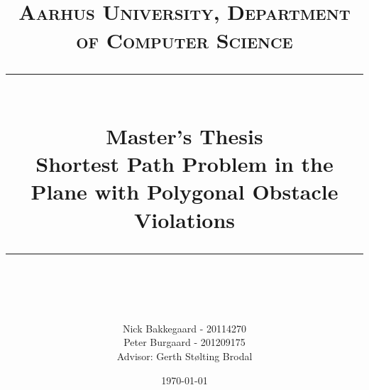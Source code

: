


\newcommand{\gerth}[1]{\todo[color=black!40]{#1}}
\newcommand{\nick}[1]{\todo[color=green!40]{#1}}
\newcommand{\peter}[1]{\todo[color=blue!40]{#1}}


\newcommand{\horrule}[1]{\rule{\linewidth}{#1}} %


\posttitle{
	\end{center}
}
\title{
	\\
	\normalfont \normalsize 
    \vspace{2cm}
	\textsc{Aarhus University, Department of Computer Science} \\ [25pt] %
	\horrule{0.5pt} \\[0.4cm] %
    \huge Master's Thesis \\
    \huge Shortest Path Problem in the Plane with Polygonal Obstacle Violations 
	\horrule{2pt} \\[0.5cm] %
}

\author{
	Nick Bakkegaard - 20114270\\
	Peter Burgaard - 201209175\\
	{\small Advisor: Gerth Stølting Brodal}
} %

\date{\normalsize\today} %



